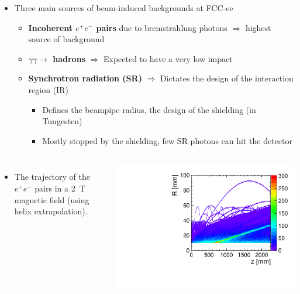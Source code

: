 \documentclass[final,xcolor={dvipsnames,svgnames,x11names,table}]{beamer}
\begin{document}
\begin{frame}
\begin{textblock}{43}
\begin{tcolorbox}[title=Beam-induced backgrounds and the impact on the drift chamber]
  \begin{itemize}
    \item Three main sources of beam-induced backgrounds at FCC-ee \vspace{0.5cm}
    \begin{itemize}
      \item \textbf{Incoherent $e^+e^-$ pairs} due to bremstrahlung photons $\Rightarrow$ highest source of background \vspace{0.2cm}
      \item \textbf{$\gamma\gamma\rightarrow$ hadrons} $\Rightarrow$ Expected to have a very low impact \vspace{0.2cm}
      \item \textbf{Synchrotron radiation (SR)} $\Rightarrow$ Dictates the design of the interaction region (IR) \vspace{0.2cm}
        \begin{itemize}
          \item Defines the beampipe radius, the design of the shielding (in Tungesten)
          \item Mostly stopped by the shielding, few SR photons can hit the detector
        \end{itemize}
    \end{itemize}
  \end{itemize}

  \begin{columns}
      \begin{itemize}
        \item The trajectory of the $e^+e^−$ pairs in a 2~T magnetic field (using helix extrapolation).
      \end{itemize}
      \centering
      \includegraphics[width=\textwidth]{../figures/pairs_R_Z}


\end{columns}
\end{tcolorbox}
\end{textblock}
\end{frame}
\end{document}
